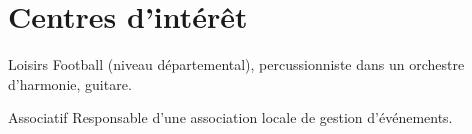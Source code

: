 \documentclass[10pt,a4paper]{moderncv}
\begin{document}
\section{Centres d'intérêt}

\cvline
	{Loisirs}
	{Football (niveau départemental), percussionniste dans un orchestre d'harmonie, guitare.}

\cvline
	{Associatif}
	{Responsable d'une association locale de gestion d'événements.}

\end{document}

